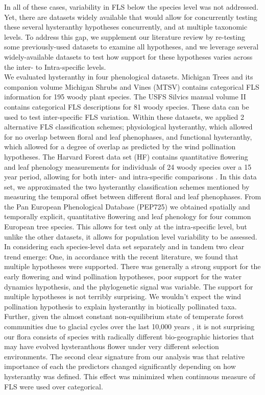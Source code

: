 \documentclass[12pt]{article}\usepackage[]{graphicx}\usepackage[]{color}
\begin{document}
\indent In all of these cases, variability in FLS below the species level was not addressed. Yet, there are datasets widely available that would allow for concurrently testing these several hysteranthy hypotheses concurrently, and at multiple taxonomic levels. To address this gap, we supplement our literature review by re-testing some previously-used datasets to examine all hypotheses, and we leverage several widely-available datasets to test how support for these hypotheses varies across the inter- to Intra-specific levels.\\ 
\indent We evaluated hysteranthy in four phenological datasets. Michigan Trees and its companion volume Michigan Shrubs and Vines \citep{Barnes2004,Barnes2016} (MTSV) contains categorical FLS information for 195 woody plant species. The USFS Silvics manual volume II \citep{Burns1990} contains categorical FLS descriptions for 81 woody species. These data can be used to test inter-specific FLS variation. Within these datasets, we applied 2 alternative FLS classification schemes; physiological hysteranthy, which allowed for no overlap between floral and leaf phenophases, and functional hysteranthy, which allowed for a degree of overlap as predicted by the wind pollination hypotheses. The Harvard Forest data set (HF) contains quantitative flowering and leaf phenology measurements for individuals of 24 woody species over a 15 year period, allowing for both inter- and intra-specific comparisons \citep{OKeefe2015}. In this data set, we approximated the two hysteranthy classification schemes mentioned by measuring the temporal offset between different floral and leaf phenophases. From the Pan European Phenological Database (PEP725) \citep{pep725} we obtained spatially and temporally explicit, quantitative flowering and leaf phenology for four common European tree species. This allows for test only at the intra-specific level, but unlike the other datasets, it allows for population level variability to be assessed.\\
\indent In considering each species-level data set separately and in tandem two clear trend emerge: One, in accordance with the recent literature, we found that multiple hypotheses were supported. There was generally a strong support for the early flowering and wind pollination hypotheses, poor support for the water dynamics hypothesis, and the phylogenetic signal was variable. The support for multiple hypotheses is not terribly surprising. We wouldn't expect the wind pollination hypothesis to explain hysteranthy in biotically pollinated taxa. Further, given the almost constant non-equilibrium state of temperate forest communities due to glacial cycles over the last 10,000 years \citep{Spurr1980}, it is not surprising our flora consists of species with radically different bio-geographic histories that may have evolved hysteranthous flower under very different selection environments. The second clear signature from our analysis was that relative importance of each the predictors changed significantly depending on how hysteranthy was defined. This effect was minimized when continuous measure of FLS were used over categorical.\\
\end{document}
